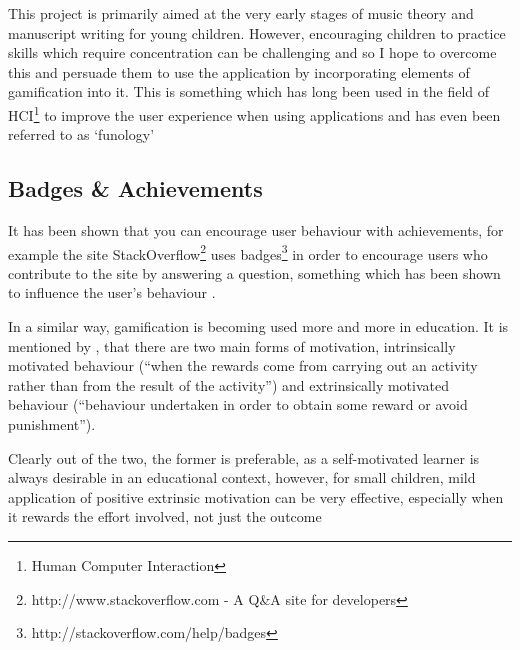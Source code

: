 This project is primarily aimed at the very early stages of music theory and manuscript writing for young children. However, encouraging children to practice skills which require concentration can be challenging and so I hope to overcome this and persuade them to use the application by incorporating elements of gamification into it. This is something which has long been used in the field of HCI\footnote{Human Computer Interaction} to improve the user experience when using applications and has even been referred to as `funology' \parencite{blythe2004funology}

\subsection*{Badges \& Achievements}
It has been shown that you can encourage user behaviour with achievements, for example the site StackOverflow\footnote{http://www.stackoverflow.com - A Q&A site for developers} uses badges\footnote{http://stackoverflow.com/help/badges} in order to encourage users who contribute to the site by answering a question, something which has been shown to influence the user's behaviour \parencite{MSR13p65}.

In a similar way, gamification is becoming used more and more in education. It is mentioned by \citeauthor{kapp2012gamification}\cite{kapp2012gamification}, that there are two main forms of motivation, intrinsically motivated behaviour (\enquote{when the rewards come from carrying out an activity rather than from the result of the activity}) and extrinsically motivated behaviour (\enquote{behaviour undertaken in order to obtain some reward or avoid punishment}).

Clearly out of the two, the former is preferable, as a self-motivated learner is always desirable in an educational context, however, for small children, mild application of positive extrinsic motivation can be very effective, especially when it rewards the effort involved, not just the outcome \parencite{motivate-kids-lifehacker}\cite{motivate-kids-lifehacker}

